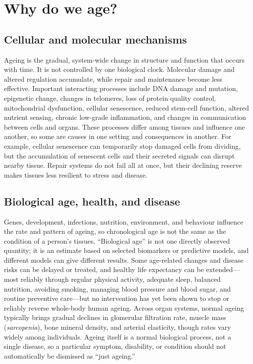 \documentclass[11pt,oneside]{report}
\begin{document}
\section{Why do we age?}

\subsection*{Cellular and molecular mechanisms}

Ageing is the gradual, system-wide change in structure and function that occurs
with time. It is not controlled by one biological clock. Molecular damage and
altered regulation accumulate, while repair and maintenance become less
effective. Important interacting processes include DNA damage and mutation,
epigenetic change, changes in telomeres, loss of protein quality control,
mitochondrial dysfunction, cellular senescence, reduced stem-cell function,
altered nutrient sensing, chronic low-grade inflammation, and changes in
communication between cells and organs. These processes differ among tissues
and influence one another, so some are causes in one setting and consequences
in another. For example, cellular senescence can temporarily stop damaged cells
from dividing, but the accumulation of senescent cells and their secreted
signals can disrupt nearby tissue. Repair systems do not fail all at once, but
their declining reserve makes tissues less resilient to stress and disease.

\subsection*{Biological age, health, and disease}

Genes, development, infections, nutrition, environment, and behaviour influence
the rate and pattern of ageing, so chronological age is not the same as the
condition of a person's tissues. ``Biological age'' is not one directly observed
quantity; it is an estimate based on selected biomarkers or predictive models,
and different models can give different results. Some age-related changes and
disease risks can be delayed or treated, and healthy life expectancy can be
extended—most reliably through regular physical activity, adequate sleep,
balanced nutrition, avoiding smoking, managing blood pressure and blood sugar,
and routine preventive care—but no intervention has yet been shown to stop or
reliably reverse whole-body human ageing. Across organ systems, normal ageing
typically brings gradual declines in glomerular filtration rate, muscle mass
(\emph{sarcopenia}), bone mineral density, and arterial elasticity, though rates
vary widely among individuals. Ageing itself is a normal biological process, not
a single disease, so a particular symptom, disability, or condition should not
automatically be dismissed as ``just ageing.''
\end{document}
